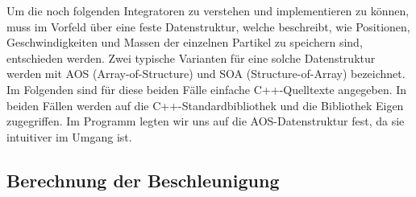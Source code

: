     Um die noch folgenden Integratoren zu verstehen und implementieren zu können, muss im Vorfeld über eine feste Datenstruktur, welche beschreibt, wie Positionen, Geschwindigkeiten und Massen der einzelnen Partikel zu speichern sind, entschieden werden.
    Zwei typische Varianten für eine solche Datenstruktur werden mit AOS (Array-of-Structure) und SOA (Structure-of-Array) bezeichnet.
    Im Folgenden sind für diese beiden Fälle einfache C++-Quelltexte angegeben.
    In beiden Fällen werden auf die C++-Standardbibliothek und die Bibliothek Eigen zugegriffen.
    Im Programm legten wir uns auf die AOS-Datenstruktur fest, da sie intuitiver im Umgang ist.
    \medskip
    \begin{tcolorbox}[colframe=black,colbacktitle=white,coltitle=black, attach boxed title to top center={yshift=-2mm},enhanced, titlerule=0.1pt, boxrule=0.5pt, arc=5pt,title=Quelltext:\quad SOA-Partikelsystem-Datenstruktur, breakable]
      
    \end{tcolorbox}

    \begin{tcolorbox}[colframe=black,colbacktitle=white,coltitle=black, attach boxed title to top center={yshift=-2mm},enhanced, titlerule=0.1pt, boxrule=0.5pt, arc=5pt,title=Quelltext:\quad AOS-Partikelsystem-Datenstruktur, breakable]
      
    \end{tcolorbox}


  \subsection{Berechnung der Beschleunigung} %
  \label{sub:berechnung_der_beschleunigung}

